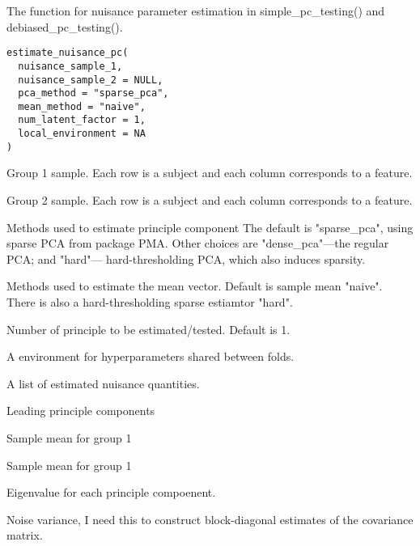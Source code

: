 \documentclass[a4paper]{book}
\begin{document}
%
\begin{Description}
The function for nuisance parameter estimation in simple\_pc\_testing() and debiased\_pc\_testing().
\end{Description}
%
\begin{Usage}
\begin{verbatim}
estimate_nuisance_pc(
  nuisance_sample_1,
  nuisance_sample_2 = NULL,
  pca_method = "sparse_pca",
  mean_method = "naive",
  num_latent_factor = 1,
  local_environment = NA
)
\end{verbatim}
\end{Usage}
%
\begin{Arguments}
\begin{ldescription}
\item[\code{nuisance\_sample\_1}] Group 1 sample. Each row is a subject and each column corresponds to a feature.

\item[\code{nuisance\_sample\_2}] Group 2 sample. Each row is a subject and each column corresponds to a feature.

\item[\code{pca\_method}] Methods used to estimate principle component The default is "sparse\_pca", using sparse PCA from package PMA. Other choices are "dense\_pca"---the regular PCA; and "hard"--- hard-thresholding PCA, which also induces sparsity.

\item[\code{mean\_method}] Methods used to estimate the mean vector. Default is sample mean "naive". There is also a hard-thresholding sparse estiamtor "hard".

\item[\code{num\_latent\_factor}] Number of principle to be estimated/tested. Default is 1.

\item[\code{local\_environment}] A environment for hyperparameters shared between folds.
\end{ldescription}
\end{Arguments}
%
\begin{Value}
A list of estimated nuisance quantities.
\begin{ldescription}
\item[\code{estimate\_leading\_pc}] Leading principle components
\item[\code{estimate\_mean\_1}] Sample mean for group 1
\item[\code{estimate\_mean\_2}] Sample mean for group 1
\item[\code{estimate\_eigenvalue}] Eigenvalue for each principle compoenent.
\item[\code{estimate\_noise\_variance}] Noise variance, I need this to construct block-diagonal estimates of the covariance matrix.
\end{ldescription}
\end{Value}
\end{document}
